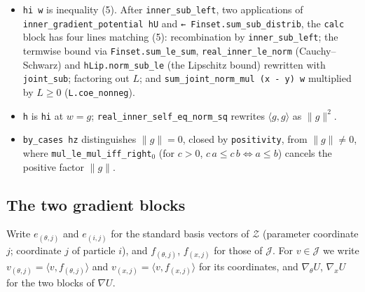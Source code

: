 \documentclass[11pt,a4paper]{report}
\begin{document}
\begin{leanbox}
\begin{enumerate}
\begin{itemize}
\item \texttt{hi w} is inequality (5). After \texttt{inner\_\allowbreak{}sub\_\allowbreak{}left}, two applications of \texttt{inner\_\allowbreak{}gradient\_\allowbreak{}potential h\allowbreak{}U} and \texttt{← Finset.\allowbreak{}sum\_\allowbreak{}sub\_\allowbreak{}distrib}, the \texttt{calc} block has four lines matching (5): recombination by \texttt{inner\_\allowbreak{}sub\_\allowbreak{}left}; the termwise bound via \texttt{Finset.\allowbreak{}sum\_\allowbreak{}le\_\allowbreak{}sum}, \texttt{real\_\allowbreak{}inner\_\allowbreak{}le\_\allowbreak{}norm} (Cauchy–Schwarz) and \texttt{h\allowbreak{}Lip.\allowbreak{}norm\_\allowbreak{}sub\_\allowbreak{}le} (the Lipschitz bound) rewritten with \texttt{joint\_\allowbreak{}sub}; factoring out \(L\); and \texttt{sum\_\allowbreak{}joint\_\allowbreak{}norm\_\allowbreak{}mul (x -\allowbreak{} y) w} multiplied by \(L\ge0\) (\texttt{L.\allowbreak{}coe\_\allowbreak{}nonneg}).

\item \texttt{h} is \texttt{hi} at \(w=g\); \texttt{real\_\allowbreak{}inner\_\allowbreak{}self\_\allowbreak{}eq\_\allowbreak{}norm\_\allowbreak{}sq} rewrites \(\langle g,g\rangle\) as \(\|g\|^2\).

\item \texttt{by\_\allowbreak{}cases hz} distinguishes \(\|g\|=0\), closed by \texttt{positivity}, from \(\|g\|\neq0\), where \texttt{mul\_\allowbreak{}le\_\allowbreak{}mul\_\allowbreak{}iff\_\allowbreak{}right\ensuremath{{}_{0}}} (for \(c>0\), \(c\,a\le c\,b\iff a\le b\)) cancels the positive factor \(\|g\|\).

\end{itemize}


\end{enumerate}
\end{leanbox}
\subsection{\texorpdfstring{The two gradient blocks}{The two gradient blocks}}
\label{report-step-IPLA-Geometry-lean-5}


Write \(e_{(\theta,j)}\) and \(e_{(i,j)}\) for the standard basis vectors of \(\mathcal Z\) (parameter coordinate \(j\); coordinate \(j\) of particle \(i\)), and \(f_{(\theta,j)}\), \(f_{(x,j)}\) for those of \(\mathcal J\). For \(v\in\mathcal J\) we write \(v_{(\theta,j)}=\langle v,f_{(\theta,j)}\rangle\) and \(v_{(x,j)}=\langle v,f_{(x,j)}\rangle\) for its coordinates, and \(\nabla_\theta U\), \(\nabla_xU\) for the two blocks of \(\nabla U\).
\end{document}
